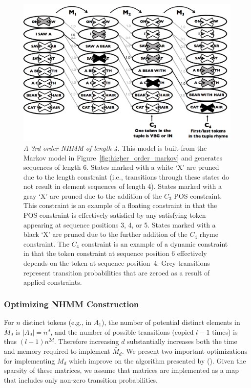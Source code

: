 \documentclass[phd,electronic,oneside,twosidetoc,letterpaper,chaptercenter,parttop,lol,lof,lot]{byumsphd}
\begin{document}
\begin{figure}
\centering
\includegraphics[width=.8\linewidth]{higher_order_nhm}
\caption{\textit{A 3rd-order NHMM of length 4.} This model is built from the Markov model in Figure~\ref{fig:higher_order_markov} and generates sequences of length 6. States marked with a white `X' are pruned due to the length constraint (i.e., transitions through these states do not result in element sequences of length 4). States marked with a gray `X' are pruned due to the addition of the $C_3$ POS constraint. This constraint is an example of a floating constraint in that the POS constraint is effectively satisfied by any satisfying token appearing at sequence positions 3, 4, or 5. States marked with a black `X' are pruned due to the further addition of the $C_4$ rhyme constraint. The $C_4$ constraint is an example of a dynamic constraint in that the token constraint at sequence position 6 effectively depends on the token at sequence position~4. Grey transitions represent transition probabilities that are zeroed as a result of applied constraints.}
\label{fig:higher_order_nhmm}
\end{figure}

\subsubsection{Optimizing NHMM Construction}

For $n$ distinct tokens (e.g., in $A_1$), the number of potential distinct elements in $\tilde{M_d}$ is $|A_d| = n^d$, and the number of possible transitions (copied $l-1$ times) is thus $(l-1)n^{2d}$. Therefore increasing $d$ substantially increases both the time and memory required to implement $\tilde{M_d}$. We present two important optimizations for implementing $M_d$ which improve on the algorithm presented by \citeauthor{pachet2011finite} (\citeyear{pachet2011finite}). Given the sparsity of these matrices, we assume that matrices are implemented as a map that includes only non-zero transition probabilities.
\end{document}

